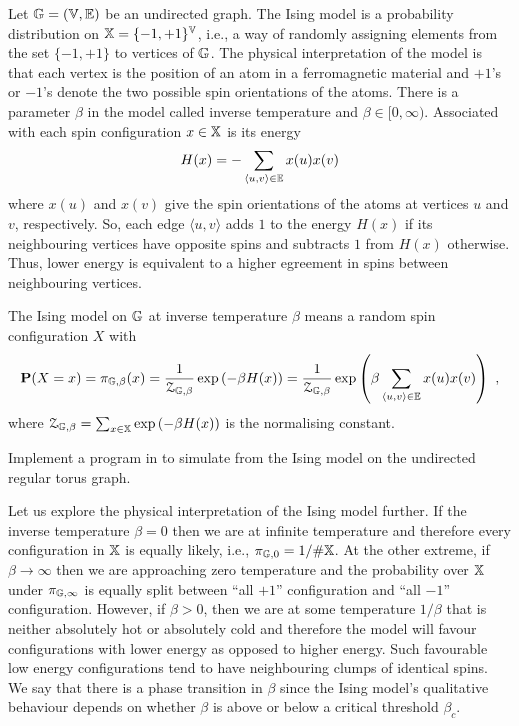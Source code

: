 \begin{model}\label{M:GlauberDynamicsIsing}
Let $\mathbb{G} = (\mathbb{V},\mathbb{E})$ be an undirected graph.  
The Ising model is a probability distribution on $\mathbb{X} = \{-1,+1\}^{\mathbb{V}}$, i.e., a way of randomly assigning elements from the set $\{-1,+1\}$ to vertices of $\mathbb{G}$.  
The physical interpretation of the model is that each vertex is the position of an atom in a ferromagnetic material and $+1$'s or $-1$'s denote the two possible spin orientations of the atoms.  
There is a parameter $\beta$ in the model called inverse temperature and $\beta \in [0,\infty)$.  
Associated with each spin configuration $x \in \mathbb{X}$ is its energy
\[
H(x) = - \sum_{\langle u, v \rangle \in \mathbb{E}} x(u) x(v) 
\]
where $x(u)$ and $x(v)$ give the spin orientations of the atoms at vertices $u$ and $v$, respectively.  
So, each edge $\langle u, v \rangle$ adds $1$ to the energy $H(x)$ if its neighbouring vertices have opposite spins and subtracts $1$ from $H(x)$ otherwise.  
Thus, lower energy is equivalent to a higher egreement in spins between neighbouring vertices.  

The Ising model on $\mathbb{G}$ at inverse temperature $\beta$ means a random spin configuration $X$ with
\[
\mathbf{P}(X=x) = \pi_{\mathbb{G},\beta}(x) = \frac{1}{\mathcal{Z}_{\mathbb{G},\beta}} \exp{\left(- \beta H(x)\right)} 
=  \frac{1}{\mathcal{Z}_{\mathbb{G},\beta}} \exp{\left(\beta \sum_{\langle u, v \rangle \in \mathbb{E}} x(u) x(v)  \right)} \enspace , 
\]
where $\mathcal{Z}_{\mathbb{G},\beta}= \sum_{x \in \mathbb{X}}\exp{\left(- \beta H(x)\right)}$ is the normalising constant.
\end{model}

\begin{labwork}
Implement a program in \Matlab to simulate from the Ising model on the undirected regular torus graph. 
\end{labwork}

Let us explore the physical interpretation of the Ising model further.  
If the inverse temperature $\beta=0$ then we are at infinite temperature and therefore every configuration in $\mathbb{X}$ is equally likely, i.e., $\pi_{\mathbb{G},0} = 1/\# \mathbb{X}$.  
At the other extreme, if $\beta \to \infty$ then we are approaching zero temperature and the probability over $\mathbb{X}$ under $\pi_{\mathbb{G},\infty}$ is equally split between ``all $+1$'' configuration and ``all $-1$'' configuration.  
However, if $\beta > 0$, then we are at some temperature $1/\beta$ that is neither absolutely hot or absolutely cold and therefore the model will favour configurations with lower energy as opposed to higher energy.  Such favourable low energy configurations tend to have neighbouring clumps of identical spins.  
We say that there is a phase transition in $\beta$ since the Ising model's qualitative behaviour depends on whether $\beta$ is above or below a critical threshold $\beta_c$. 

